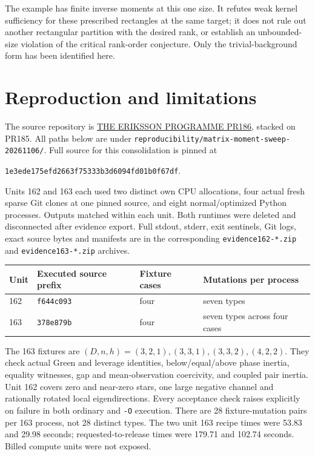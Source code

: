 \documentclass[11pt,a4paper]{article}
\begin{document}
The example has finite inverse moments at this one size. It refutes weak
kernel sufficiency for these prescribed rectangles at the same target;
it does not rule out another rectangular partition with the desired rank,
or establish an unbounded-size violation of the critical rank-order
conjecture. Only the trivial-background form has been identified here.


\section{Reproduction and limitations}\label{sec:evidence}
The source repository is
\href{https://github.com/lluiseriksson/THE-ERIKSSON-PROGRAMME/pull/186}{THE ERIKSSON PROGRAMME PR186},
stacked on PR185. All paths below are under
\texttt{reproducibility/matrix-moment-sweep-20261106/}.
Full source for this consolidation is pinned at
\begin{center}\small\texttt{1e3ede175efd2663f75333b3d6094fd01b0f67df}.\end{center}
Units 162 and 163 each used two distinct own CPU allocations, four actual
fresh sparse Git clones at one pinned source, and eight normal/optimized
Python processes. Outputs matched within each unit. Both runtimes were
deleted and disconnected after evidence export. Full stdout, stderr, exit
sentinels, Git logs, exact source bytes and manifests are in the corresponding
\texttt{evidence162-*.zip} and \texttt{evidence163-*.zip} archives.

\begin{center}\small
\begin{tabular}{llll}
\toprule
Unit & Executed source prefix & Fixture cases & Mutations per process\\
\midrule
162 & \texttt{f644c093} & four & seven types\\
163 & \texttt{378e879b} & four & seven types across four cases\\
\bottomrule
\end{tabular}
\end{center}
The 163 fixtures are $(D,n,h)=(3,2,1),(3,3,1),(3,3,2),(4,2,2)$.
They check actual Green and leverage identities, below/equal/above phase
inertia, equality witnesses, gap and mean-observation coercivity, and coupled
pair inertia. Unit 162 covers zero and near-zero stars, one large negative
channel and rationally rotated local eigendirections. Every acceptance check
raises explicitly on failure in both ordinary and \texttt{-O} execution.
There are 28 fixture-mutation pairs per 163 process, not 28 distinct types.
The two unit 163 recipe times were 53.83 and 29.98 seconds; requested-to-release
times were 179.71 and 102.74 seconds. Billed compute units were not exposed.
\end{document}
